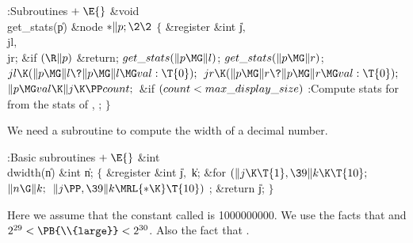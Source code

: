 \B{}:Subroutines\X${}\mathrel+\E{}$\6
\&{void} \\{get\_stats}(\|p)\1\1\6
\&{node} ${}{*}\|p;\2\2{}$\6
${}\{{}$\1\6
\&{register} \&{int} \|j${},{}$ \\{jl}${},{}$ \\{jr};\7
\&{if} ${}(\R\|p){}$\1\5
\&{return};\2\6
${}\\{get\_stats}(\|p\MG\|l){}$;\5
${}\\{get\_stats}(\|p\MG\|r){}$;\6
${}\\{jl}\K(\|p\MG\|l\?\|p\MG\|l\MG\\{val}:\T{0});{}$\6
${}\\{jr}\K(\|p\MG\|r\?\|p\MG\|r\MG\\{val}:\T{0});{}$\6
${}\|p\MG\\{val}\K\|j\K\PP\\{count};{}$\6
\&{if} ${}(\\{count}<\\{max\_display\_size}){}$\1\5
:Compute stats for  from the stats of , \X;\2%
\6
\4${}\}{}$\2\par
\fi

We need a subroutine to compute the width of a decimal number.

\Y\B\4:Basic subroutines\X${}\mathrel+\E{}$\6
\&{int} \\{dwidth}(\|n)\1\1\6
\&{int} \|n;\2\2\6
${}\{{}$\1\6
\&{register} \&{int} \|j${},{}$ \|k;\7
\&{for} ${}(\|j\K\T{1},\39\|k\K\T{10};{}$ ${}\|n\G\|k;{}$ ${}\|j\PP,\39\|k%
\MRL{*{\K}}\T{10}){}$\1\5
;\2\6
\&{return} \|j;\6
\4${}\}{}$\2\par
\fi

Here we assume that the constant called  is 1000000000.
We use the facts that  and $2^{29}<\PB{%
\\{large}}<2^{30}$.
Also the fact that .

